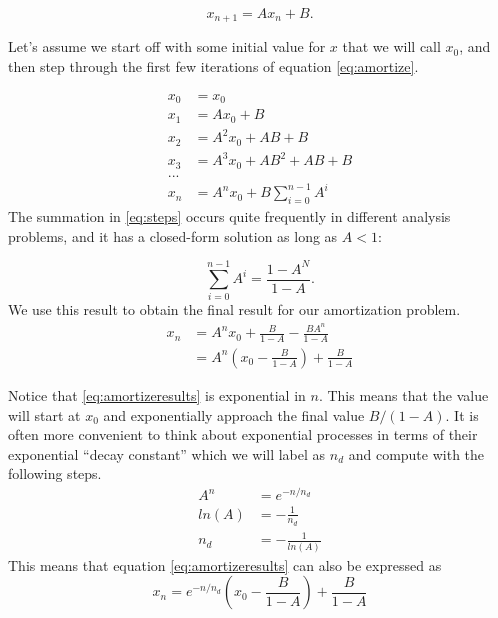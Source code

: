 \documentclass[../../main.tex]{subfiles}
\begin{document}
\begin{equation}
    \label{eq:amortize}
    x_{n+1} = A x_n + B.
\end{equation}

Let's assume we start off with some initial value for $x$ that we will call
$x_0$, and then step through the first few iterations of equation
\eqref{eq:amortize}.

\begin{align}
    \label{eq:steps}
    x_0 &= x_0\nonumber\\
    x_1 &= A x_0 + B\nonumber\\
    x_2 &= A^2 x_0 + AB + B\nonumber\\
    x_3 &= A^3 x_0 + AB^2 + AB + B\nonumber\\
    ...\nonumber\\
    x_n &=
        A^n x_0 +
        B\sum\limits_{i=0}^{n-1}A^i
\end{align}
The summation in \eqref{eq:steps} occurs quite frequently in different
analysis problems, and it has a closed-form solution as long as $A < 1$:

\begin{equation}
    \label{eq:summation}
    \sum\limits_{i=0}^{n-1}A^i = \frac{1 - A ^ N}{1 - A}.
\end{equation}
We use this result to obtain the final result for our amortization problem.
\begin{align}
    \label{eq:amortizeresults}
    x_n &= A^n x_0 + \frac{B}{1 - A} - \frac{B A ^ n}{1 - A} \nonumber\\
        &= A^n \left( x_0 - \frac{B}{1 - A} \right) + \frac{B}{1 - A}
\end{align}

Notice that \eqref{eq:amortizeresults} is exponential in $n$.  This means
that the value will start at $x_0$ and exponentially approach the final value
$B / (1-A)$.  It is often more convenient to think about exponential processes
in terms of their exponential ``decay constant'' which we will label as
$n_d$ and compute with the following steps.
\begin{align}
    \label{eq:decay}
    A^n &= e^{-n / n_d} \nonumber\\
    ln(A) &= -\frac{1}{n_d} \nonumber\\
    n_d &= -\frac{1}{ln(A)}
\end{align}
This means that equation \eqref{eq:amortizeresults} can also be expressed as
\begin{equation}
    \label{eq:amortizeresultsexp}
    x_n = e^{-n/n_d}
          \left( x_0 - \frac{B}{1 - A} \right) + \frac{B}{1 - A}
\end{equation}
\end{document}
